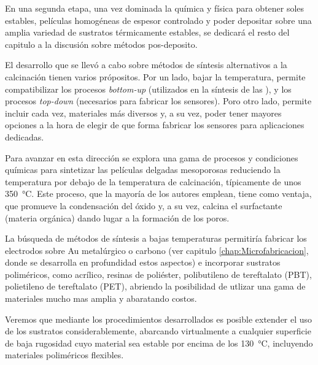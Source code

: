	En una segunda etapa, una vez dominada la química y física para obtener soles estables, películas homogéneas de espesor controlado y poder depositar sobre una amplia variedad de sustratos térmicamente estables, se dedicará el resto del capitulo a la discusión sobre métodos pos-deposito. 

	El desarrollo que se llevó a cabo sobre métodos de síntesis alternativos a la calcinación tienen varios própositos. 
	Por un lado, bajar la temperatura, permite compatibilizar los procesos \textit{bottom-up} (utilizados en la síntesis de las \pdm), y los procesos \textit{top-down} (necesarios para fabricar los sensores). Poro otro lado, permite incluir cada vez, materiales más diversos y, a su vez, poder tener mayores opciones a la hora de elegir de que forma fabricar los sensores para aplicaciones dedicadas\cite{Doshi2000a,Wagner2013,Innocenzi2013,Soler-Illia2002a}.

	Para avanzar en esta dirección se explora una gama de procesos y condiciones químicas para sintetizar las películas delgadas mesoporosas reduciendo la temperatura por debajo de la temperatura de calcinación, típicamente de unos \SI{350}{\celsius}. Este proceso, que la mayoría de los autores emplean, tiene como ventaja, que promueve la condensación del óxido y, a su vez, calcina el surfactante (materia orgánica) dando lugar a la formación de los poros.\cite{Zhang2015,Horiuchi2011,Clark2000,Zhang2005}

	La búsqueda de métodos de síntesis a bajas temperaturas permitiría fabricar los electrodos sobre Au metalúrgico o carbono (ver capitulo \ref{chap:Microfabricacion}, donde se desarrolla en profundidad estos aspectos) e incorporar sustratos poliméricos, como acrílico, resinas de poliéster, polibutileno de tereftalato (PBT), polietileno de tereftalato (PET), abriendo la posibilidad de utlizar una gama de materiales mucho mas amplia y abaratando costos.

	Veremos que mediante los procedimientos desarrollados es posible extender el uso de los sustratos considerablemente, abarcando virtualmente a cualquier superficie de baja rugosidad cuyo material sea estable por encima de los \SI{130}{\celsius}, incluyendo materiales poliméricos flexibles.
		

